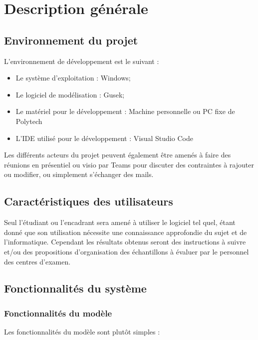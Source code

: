 \documentclass{polytech/polytech}
\numberwithin{figure}{chapter}
\begin{document}
\chapter{Description générale}
\section{Environnement du projet}

L’environnement de développement est le suivant :
\begin{itemize}
    \item Le système d’exploitation : Windows;
    \item Le logiciel de modélisation : Gusek;
    \item Le matériel pour le développement : Machine personnelle ou PC fixe de Polytech\\
    \item L'IDE utilisé pour le développement : Visual Studio Code
\end{itemize}

Les différents acteurs du projet peuvent également être amenés à faire des réunions en présentiel ou visio par Teams pour discuter des contraintes à rajouter ou modifier, ou simplement s'échanger des mails.


\section{Caractéristiques des utilisateurs}

Seul l'étudiant ou l'encadrant sera amené à utiliser le logiciel tel quel, étant donné que son utilisation nécessite une connaissance approfondie du sujet et de l'informatique. Cependant les résultats obtenus seront des instructions à suivre et/ou des propositions d'organisation des échantillons à évaluer par le personnel des centres d'examen.
\pagebreak

\section{Fonctionnalités du système}
\subsection{Fonctionnalités du modèle}
Les fonctionnalités du modèle sont plutôt simples :
\end{document}
